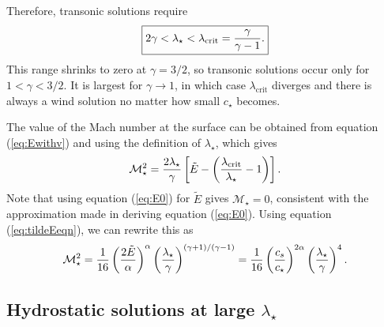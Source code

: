 \documentclass[preprint,12pt]{aastex}
\begin{document}
Therefore, transonic solutions require
\begin{equation}
\boxed{
2\gamma < \lambda_\star < \lambda_\mathrm{crit} ={\gamma\over \gamma-1}.
}
\end{equation}
This range shrinks to zero at $\gamma=3/2$, so transonic solutions occur only for $1<\gamma<3/2$. It is largest for $\gamma\rightarrow 1$, in which case $\lambda_\mathrm{crit}$ diverges and there is always a wind solution no matter how small $c_\star$ becomes.

The value of the Mach number at the surface can be obtained from equation (\ref{eq:Ewithv}) and using the definition of $\lambda_\star$, which gives
\begin{equation}
\mathcal{M}_\star^2 = {2\lambda_\star\over \gamma}\left[\tilde{E} - \left(  {\lambda_\mathrm{crit}\over \lambda_\star}-1\right)\right].
\end{equation}
Note that using equation (\ref{eq:E0}) for $\tilde{E}$ gives $\mathcal{M}_\star=0$, consistent with the approximation made in deriving equation (\ref{eq:E0}). Using equation (\ref{eq:tildeEeqn}), we can rewrite this as
\begin{equation}
\mathcal{M}_\star^2 = {1\over 16}\left({2\tilde{E}\over\alpha}\right)^\alpha \left({\lambda_\star\over \gamma}\right)^{(\gamma+1)/(\gamma-1)} = {1\over 16}\left({c_s\over c_\star}\right)^{2\alpha} \left({\lambda_\star\over \gamma}\right)^4.
\end{equation}

\subsection{Hydrostatic solutions at large $\lambda_\star$}
\end{document}
